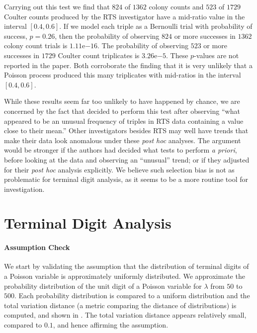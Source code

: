 \documentclass[11pt]{article}
\newcommand{\expnum}[2]{{#1}\mathrm{e}{#2}}
\begin{document}
Carrying out this test we find that $824$ of $1362$ colony counts and $523$ of $1729$ Coulter counts produced by the RTS investigator have a mid-ratio value in the interval $\left[0.4, 0.6\right]$. If we model each triple as a Bernoulli trial with probability of success, $p = 0.26$, then the probability of observing $824$ or more successes in $1362$ colony count trials is $\expnum{1.11}{-16}$. The probability of observing $523$ or more successes in $1729$ Coulter count triplicates is $\expnum{3.26}{-5}$. These $p$-values are not reported in the paper. Both corroborate the finding that it is very unlikely that a Poisson process produced this many triplicates with mid-ratios in the interval $\left[0.4, 0.6\right]$.

While these results seem far too unlikely to have happened by chance, we are concerned by the fact that \citeauthor{Pitt:2016cu} decided to perform this test after observing ``what appeared to be an unusual frequency of triples in RTS data containing a value close to their mean.'' Other investigators besides RTS may well have trends that make their data look anomalous under these {\it post hoc} analyses. The argument would be stronger if the authors had decided what tests to perform {\it a priori}, before looking at the data and observing an ``unusual'' trend; or if they adjusted for their {\it post hoc} analysis explicitly. We believe such selection bias is not as problematic for terminal digit analysis, as it seems to be a more routine tool for investigation.

\section{Terminal Digit Analysis}

\paragraph{Assumption Check} We start by validating the assumption that the distribution of terminal digits of a Poisson variable is approximately uniformly distributed. We approximate the probability distribution of the unit digit of a Poisson variable for $\lambda$ from $50$ to $500$. Each probability distribution is compared to a uniform distribution and the total variation distance (a metric comparing the distance of distributions) is computed, and shown in . The total variation distance appears relatively small, compared to $0.1$, and hence affirming the assumption.
\end{document}
